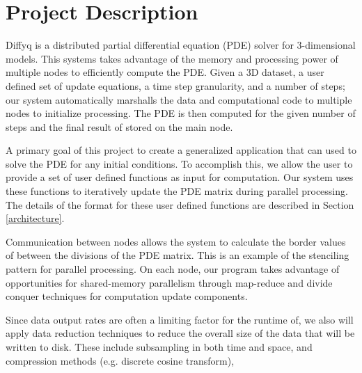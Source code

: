 \section{Project Description}
Diffyq is a distributed partial differential equation (PDE) solver for 3-dimensional models.  This systems takes advantage of the memory and processing power of multiple nodes to efficiently compute the PDE.  Given a 3D dataset, a user defined set of update equations, a time step granularity, and a number of steps; our system automatically marshalls the data and computational code to multiple nodes to initialize processing.  The PDE is then computed for the given number of steps and the final result of stored on the main node.

A primary goal of this project to create a generalized application that can used to solve the PDE for any initial conditions.  To accomplish this, we allow the user to provide a set of user defined functions as input for computation.  Our system uses these functions to iteratively update the PDE matrix during parallel processing.  The details of the format for these user defined functions are described in Section \ref{architecture}.

Communication between nodes allows the system to calculate the border values of between the divisions of the PDE matrix.  This is an example of the stenciling pattern for parallel processing.  On each node, our program takes advantage of opportunities for shared-memory parallelism through map-reduce and divide conquer techniques for computation update components.

Since data output rates are often a limiting factor for the runtime of, we also will apply data reduction techniques to reduce the overall size of the data that will be written to disk. These include subsampling in both time and space, and compression methods (e.g. discrete cosine transform),